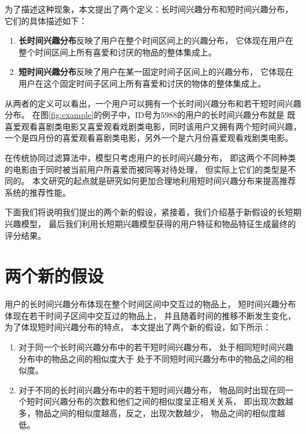 为了描述这种现象，本文提出了两个定义：长时间兴趣分布和短时间兴趣分布，
它们的具体描述如下：

\begin{enumerate}
\item \textbf{长时间兴趣分布}反映了用户在整个时间区间上的兴趣分布，
它体现在用户在整个时间区间上所有喜爱和讨厌的物品的整体集成上。
\item \textbf{短时间兴趣分布}反映了用户在某一固定时间子区间上的兴趣分布，
它体现在用户在这个固定时间子区间上所有喜爱和讨厌的物体的整体集成上。
\end{enumerate}

从两者的定义可以看出，一个用户可以拥有一个长时间兴趣分布和若干短时间兴趣分布。
在图\ref{fig:example}的例子中，ID号为$5988$的用户的长时间兴趣分布就是
既喜爱观看喜剧类电影又喜爱观看戏剧类电影，同时该用户又拥有两个短时间兴趣，
一个是四月份的喜爱观看喜剧类电影，另外一个是六月份喜爱观看戏剧类电影。

在传统协同过滤算法中，模型只考虑用户的长时间兴趣分布，
即这两个不同种类的电影由于同时被当前用户所喜爱而被同等对待处理，
但实际上它们的类型是不同的。
本文研究的起点就是研究如何更加合理地利用短时间兴趣分布来提高推荐系统的推荐性能。

下面我们将说明我们提出的两个新的假设，紧接着，我们介绍基于新假设的长短期兴趣模型，
最后我们利用长短期兴趣模型获得的用户特征和物品特征生成最终的评分结果。

\section{两个新的假设}
用户的长时间兴趣分布体现在整个时间区间中交互过的物品上，
短时间兴趣分布体现在若干时间子区间中交互过的物品上，
并且随着时间的推移不断发生变化，为了体现短时间兴趣分布的特点，
本文提出了两个新的假设，如下所示：

\begin{enumerate}
\item 对于同一个长时间兴趣分布中的若干短时间兴趣分布，
处于相同短时间兴趣分布中的物品之间的相似度大于
处于不同短时间兴趣分布中的物品之间的相似度。
\item 对于不同的长时间兴趣分布中的若干短时间兴趣分布，
物品同时出现在同一个短时间兴趣分布的次数和他们之间的相似度呈正相关关系，
即出现次数越多，物品之间的相似度越高，反之，出现次数越少，
物品之间的相似度越低。
\end{enumerate}

